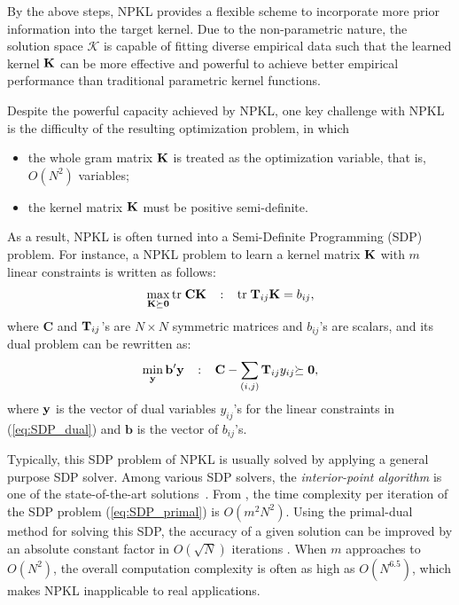 By the above steps, NPKL provides a flexible scheme to incorporate more prior
information into the target kernel. Due to the non-parametric nature, the solution
space $\mathcal K$ is capable of fitting diverse empirical data such that the learned
kernel ${\mathbf K}$ can be more effective and powerful to achieve better empirical
performance than traditional parametric kernel functions.


Despite the powerful capacity achieved by NPKL, one key challenge with NPKL is
the difficulty of the resulting optimization problem, in which \vspace{-0.1in}
\begin{itemize}
  \item the whole gram matrix ${\mathbf K}$ is treated as the optimization variable, that is,
    $O(N^2)$ variables; %
  \item the kernel matrix ${\mathbf K}$ must be positive semi-definite. %
\end{itemize}
As a result, NPKL is often turned into a Semi-Definite Programming (SDP) problem. For instance, a NPKL problem to learn a kernel matrix ${\mathbf K}$ with $m$ linear constraints is written as follows:
\begin{eqnarray}
\max_{\K \psd} \tr \mathbf C\K \;\;\;:\;\;\; \tr\T_{ij}\K = b_{ij}, \label{eq:SDP_dual}
\end{eqnarray}
where $\mathbf C$ and ${\bf T}_{ij}$'s are $N\times N$ symmetric matrices and $b_{ij}$'s are scalars, and its dual problem can be rewritten as:
\begin{eqnarray}
\min_{\y} \mathbf b'\y \;\;\;:\;\;\; \mathbf C-\sum_{(i,j)}\T_{ij}y_{ij} \psd, \label{eq:SDP_primal}
\end{eqnarray}
where $\mathbf{y}$ is the vector of dual variables $y_{ij}$'s for the linear constraints in (\ref{eq:SDP_dual}) and $\mathbf b$ is the vector of $b_{ij}$'s.

Typically, this SDP problem of NPKL is usually solved by applying a general
purpose SDP solver. Among various SDP solvers, the {\em interior-point algorithm} is one of the state-of-the-art solutions~\cite{Boyd}. From \cite{laa/LoboVBL98}, the time complexity per iteration of the SDP problem (\ref{eq:SDP_primal}) is $O(m^2N^2)$. Using the primal-dual method for solving this SDP, the
accuracy of a given solution can be improved by an absolute
constant factor in $O(\sqrt{N})$ iterations \cite{NesterovN94}. When $m$ approaches to $O(N^2)$, the overall computation complexity is often as high as $O(N^{6.5})$, which makes NPKL inapplicable to real applications.

